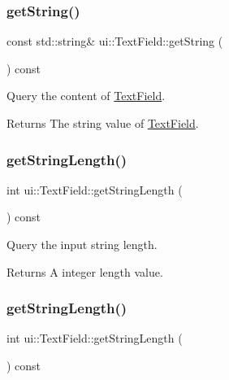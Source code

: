 \subsubsection{\texorpdfstring{get\+String()}{getString()}\hspace{0.1cm}{\footnotesize\ttfamily [2/2]}}
{\footnotesize\ttfamily const std\+::string\& ui\+::\+Text\+Field\+::get\+String (\begin{DoxyParamCaption}{ }\end{DoxyParamCaption}) const}

Query the content of \hyperlink{classui_1_1TextField}{Text\+Field}. \begin{DoxyReturn}{Returns}
The string value of \hyperlink{classui_1_1TextField}{Text\+Field}. 
\end{DoxyReturn}
\mbox{\label{classui_1_1TextField_a5c3bc7fe189d790d4e209527dbeba2ab}} 
\subsubsection{\texorpdfstring{get\+String\+Length()}{getStringLength()}\hspace{0.1cm}{\footnotesize\ttfamily [1/2]}}
{\footnotesize\ttfamily int ui\+::\+Text\+Field\+::get\+String\+Length (\begin{DoxyParamCaption}{ }\end{DoxyParamCaption}) const}



Query the input string length. 

\begin{DoxyReturn}{Returns}
A integer length value. 
\end{DoxyReturn}
\mbox{\label{classui_1_1TextField_a5c3bc7fe189d790d4e209527dbeba2ab}} 
\subsubsection{\texorpdfstring{get\+String\+Length()}{getStringLength()}\hspace{0.1cm}{\footnotesize\ttfamily [2/2]}}
{\footnotesize\ttfamily int ui\+::\+Text\+Field\+::get\+String\+Length (\begin{DoxyParamCaption}{ }\end{DoxyParamCaption}) const}



